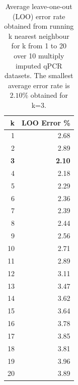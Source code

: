 \documentclass[12pt,a4paper,twoside]{article}
\begin{document}
\begin{table}[ht]
\centering
\begin{tabular}{rr}
  \hline
k &  LOO Error \% \\ 
  \hline
1 & 2.68 \\ 
2 & 2.89 \\ 
\bf{3} & \bf{2.10} \\ 
4 & 2.18 \\ 
5 & 2.29 \\ 
6 & 2.36 \\ 
7 & 2.39 \\ 
8 & 2.44 \\ 
9 & 2.56 \\ 
10 & 2.71 \\ 
11 & 2.89 \\ 
12 & 3.11 \\ 
13 & 3.47 \\ 
14 & 3.62 \\ 
15 & 3.64 \\ 
16 & 3.78 \\ 
17 & 3.85 \\ 
18 & 3.81 \\ 
19 & 3.96 \\ 
20 & 3.89 \\ 
   \hline
\end{tabular}
\caption{
    \label{table:knn-loo}
    Average  leave-one-out (LOO) error rate obtained from running k nearest neighbour for k from 1 to 20 over 10 multiply imputed qPCR datasets.
    The smallest average error rate is $2.10\%$ obtained for k=3.
}
\end{table}
\end{document}
